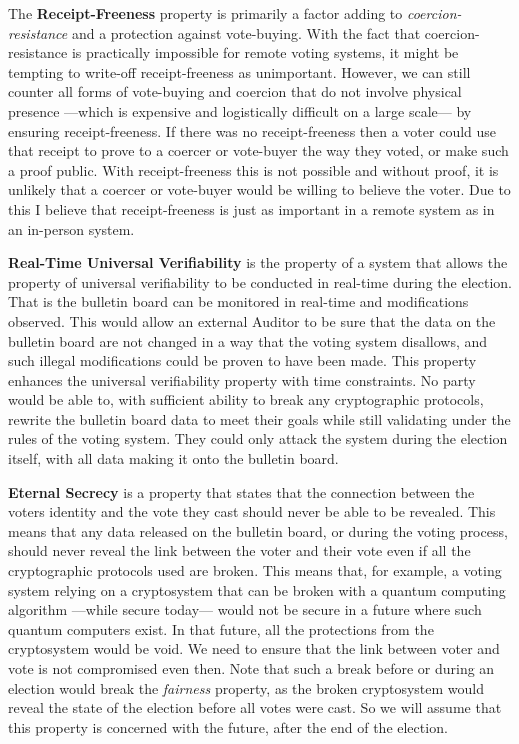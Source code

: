 The \textbf{Receipt-Freeness} property is primarily a factor adding to \emph{coercion-resistance} and a protection against vote-buying. With the fact that coercion-resistance is practically impossible for remote voting systems, it might be tempting to write-off receipt-freeness as unimportant. However, we can still counter all forms of vote-buying and coercion that do not involve physical presence ---which is expensive and logistically difficult on a large scale--- by ensuring receipt-freeness. If there was no receipt-freeness then a voter could use that receipt to prove to a coercer or vote-buyer the way they voted, or make such a proof public. With receipt-freeness this is not possible and without proof, it is unlikely that a coercer or vote-buyer would be willing to believe the voter. Due to this I believe that receipt-freeness is just as important in a remote system as in an in-person system.

\textbf{Real-Time Universal Verifiability} is the property of a system that allows the property of universal verifiability to be conducted in real-time during the election. That is the bulletin board can be monitored in real-time and modifications observed. This would allow an external Auditor to be sure that the data on the bulletin board are not changed in a way that the voting system disallows, and such illegal modifications could be proven to have been made. This property enhances the universal verifiability property with time constraints. No party would be able to, with sufficient ability to break any cryptographic protocols, rewrite the bulletin board data to meet their goals while still validating under the rules of the voting system. They could only attack the system during the election itself, with all data making it onto the bulletin board.

\textbf{Eternal Secrecy} is a property that states that the connection between the voters identity and the vote they cast should never be able to be revealed. This means that any data released on the bulletin board, or during the voting process, should never reveal the link between the voter and their vote even if all the cryptographic protocols used are broken. This means that, for example, a voting system relying on a cryptosystem that can be broken with a quantum computing algorithm ---while secure today--- would not be secure in a future where such quantum computers exist. In that future, all the protections from the cryptosystem would be void. We need to ensure that the link between voter and vote is not compromised even then. Note that such a break before or during an election would break the \emph{fairness} property, as the broken cryptosystem would reveal the state of the election before all votes were cast. So we will assume that this property is concerned with the future, after the end of the election.



